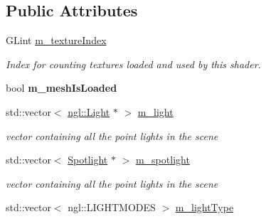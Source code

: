 \subsection*{Public Attributes}
\begin{DoxyCompactItemize}
\item 
\hypertarget{class_object_loader_a477c658216ae723c06ffefb1cc123a04}{G\-Lint \hyperlink{class_object_loader_a477c658216ae723c06ffefb1cc123a04}{m\-\_\-texture\-Index}}\label{class_object_loader_a477c658216ae723c06ffefb1cc123a04}

\begin{DoxyCompactList}\small\item\em Index for counting textures loaded and used by this shader. \end{DoxyCompactList}\item 
\hypertarget{class_object_loader_a25b0c1c8390e13a351ab7334fc1dc1fc}{bool {\bfseries m\-\_\-mesh\-Is\-Loaded}}\label{class_object_loader_a25b0c1c8390e13a351ab7334fc1dc1fc}

\item 
\hypertarget{class_object_loader_a3d70ee2ce56daeaced002dd6d3797283}{std\-::vector$<$ \hyperlink{classngl_1_1_light}{ngl\-::\-Light} $\ast$ $>$ \hyperlink{class_object_loader_a3d70ee2ce56daeaced002dd6d3797283}{m\-\_\-light}}\label{class_object_loader_a3d70ee2ce56daeaced002dd6d3797283}

\begin{DoxyCompactList}\small\item\em vector containing all the point lights in the scene \end{DoxyCompactList}\item 
\hypertarget{class_object_loader_a759ade5adb03d58bca0ff4b966994081}{std\-::vector$<$ \hyperlink{class_spotlight}{Spotlight} $\ast$ $>$ \hyperlink{class_object_loader_a759ade5adb03d58bca0ff4b966994081}{m\-\_\-spotlight}}\label{class_object_loader_a759ade5adb03d58bca0ff4b966994081}

\begin{DoxyCompactList}\small\item\em vector containing all the point lights in the scene \end{DoxyCompactList}\item 
\hypertarget{class_object_loader_a2ea656821677e535f3e0044536c55c9f}{std\-::vector$<$ ngl\-::\-L\-I\-G\-H\-T\-M\-O\-D\-E\-S $>$ \hyperlink{class_object_loader_a2ea656821677e535f3e0044536c55c9f}{m\-\_\-light\-Type}}\label{class_object_loader_a2ea656821677e535f3e0044536c55c9f}


\end{DoxyCompactItemize}
